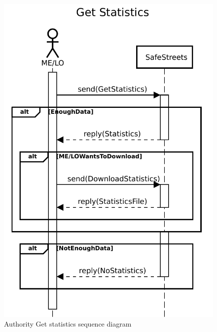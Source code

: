 						\begin{figure}[!h]
								\centering
							\includegraphics[height=0.4\textheight] {images/SequenceDiagram/Authority/SeeStatistics.pdf}
								\caption{Authority Get statistics sequence diagram}
						\end{figure}
					\clearpage
